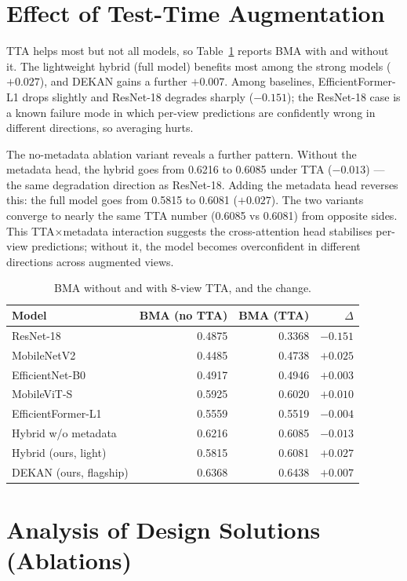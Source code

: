 \section{Effect of Test-Time Augmentation}

TTA helps most but not all models, so Table~\ref{tab:tta} reports BMA with and
without it. The lightweight hybrid (full model) benefits most among the strong
models ($+0.027$), and DEKAN gains a further $+0.007$. Among baselines,
EfficientFormer-L1 drops slightly and ResNet-18 degrades sharply ($-0.151$);
the ResNet-18 case is a known failure mode in which per-view predictions are
confidently wrong in different directions, so averaging hurts.

The no-metadata ablation variant reveals a further pattern. Without the metadata
head, the hybrid goes from 0.6216 to 0.6085 under TTA ($-0.013$) --- the same
degradation direction as ResNet-18. Adding the metadata head reverses this:
the full model goes from 0.5815 to 0.6081 ($+0.027$). The two variants
converge to nearly the same TTA number (0.6085 vs 0.6081) from opposite sides.
This TTA$\times$metadata interaction suggests the cross-attention head
stabilises per-view predictions; without it, the model becomes overconfident
in different directions across augmented views.

\begin{table}[H]
\centering
\caption{BMA without and with 8-view TTA, and the change.}
\label{tab:tta}
\begin{tabular}{lrrr}
\toprule
Model & BMA (no TTA) & BMA (TTA) & $\Delta$ \\
\midrule
ResNet-18            & 0.4875 & 0.3368 & $-0.151$ \\
MobileNetV2          & 0.4485 & 0.4738 & $+0.025$ \\
EfficientNet-B0      & 0.4917 & 0.4946 & $+0.003$ \\
MobileViT-S          & 0.5925 & 0.6020 & $+0.010$ \\
EfficientFormer-L1   & 0.5559 & 0.5519 & $-0.004$ \\
\midrule
Hybrid w/o metadata  & 0.6216 & 0.6085 & $-0.013$ \\
Hybrid (ours, light) & 0.5815 & 0.6081 & $+0.027$ \\
DEKAN (ours, flagship) & 0.6368 & 0.6438 & $+0.007$ \\
\bottomrule
\end{tabular}
\end{table}

\section{Analysis of Design Solutions (Ablations)}

